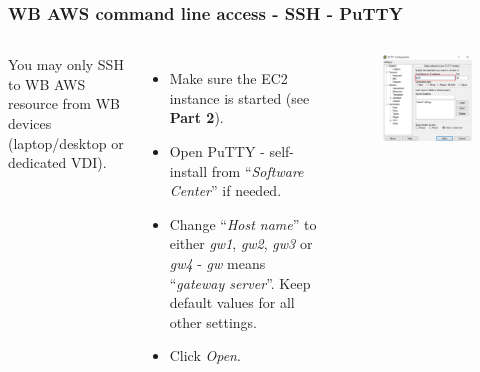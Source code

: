 \documentclass[aspectratio=169]{beamer} %
\begin{document}
\begin{frame}
	\frametitle{WB AWS command line access - SSH - PuTTY}
	\begin{columns}[c]
		You may only SSH to WB AWS resource from WB devices
		(laptop/desktop or dedicated VDI).
		
		\vspace{.2cm}
		
		\begin{itemize}
			\item Make sure the EC2 instance is started
			(see \textbf{Part 2}).
			\item Open PuTTY - self-install from 
			``\textit{Software Center}'' if needed.
			\item Change ``\textit{Host name}''
			to either \textit{gw1}, \textit{gw2},
			\textit{gw3} or \textit{gw4}
			- \textit{gw} means ``\textit{gateway server}''. 
			Keep default values for all other settings.
			\item Click \textit{Open}.
		\end{itemize}

		\begin{figure}
			\centering
			\includegraphics[width=\textwidth]{./img/access-1.png}
		\end{figure}

	\end{columns}
\end{frame}
\end{document}
